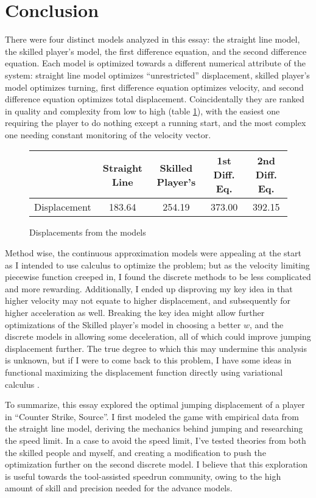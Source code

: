 

\section{Conclusion}
There were four distinct models analyzed in this essay: the straight line model, the skilled player's model, the first difference equation, and the second difference equation. Each model is optimized towards a different numerical attribute of the system: straight line model optimizes ``unrestricted'' displacement, skilled player's model optimizes turning, first difference equation optimizes velocity, and second difference equation optimizes total displacement. Coincidentally they are ranked in quality and complexity from low to high (table \ref{tbl:dis}), with the easiest one requiring the player to do nothing except a running start, and the most complex one needing constant monitoring of the velocity vector.

\begin{figure}[H]
    \centering
    \begin{tabular}{|c|c|c|c|c|}
        \hline
        & Straight Line & Skilled Player's & 1st Diff. Eq. & 2nd Diff. Eq.\\
        \hline
        Displacement & 183.64  & 254.19 & 373.00 & 392.15 \\
        \hline
    \end{tabular}
    \caption{Displacements from the models}
    \label{tbl:dis}
\end{figure}

Method wise, the continuous approximation models were appealing at the start as I intended to use calculus to optimize the problem; but as the velocity limiting piecewise function creeped in, I found the discrete methods to be less complicated and more rewarding. Additionally, I ended up disproving my key idea in that higher velocity may not equate to higher displacement, and subsequently for higher acceleration as well. Breaking the key idea might allow further optimizations of the Skilled player's model in choosing a better $w$, and the discrete models in allowing some deceleration, all of which could improve jumping displacement further. The true degree to which this may undermine this analysis is unknown, but if I were to come back to this problem, I have some ideas in functional maximizing the displacement function directly using variational calculus .

To summarize, this essay explored the optimal jumping displacement of a player in ``Counter Strike, Source''. I first modeled the game with empirical data from the straight line model, deriving the mechanics behind jumping and researching the speed limit. In a case to avoid the speed limit, I've tested theories from both the skilled people and myself, and creating a modification to push the optimization further on the second discrete model. I believe that this exploration is useful towards the tool-assisted speedrun community, owing to the high amount of skill and precision needed for the advance models.

